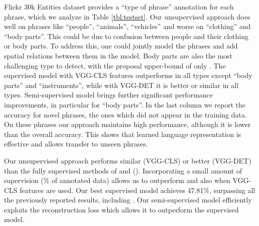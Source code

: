 Flickr 30k Entities dataset provides a ``type of phrase'' annotation for each phrase, which we analyze in Table \ref{tbl:testset}. Our unsupervised approach does well on phrases like ``people'', ``animals'', ``vehicles'' and worse on ``clothing'' and ``body parts''. This could be due to confusion between people and their clothing or body parts. To address this, one could jointly model the phrases and add spatial relations between them in the model. Body parts are also the most challenging type to detect, with the proposal upper-bound of only . The supervised model with VGG-CLS features outperforms \cite{plummer15iccv} in all  types except ``body parts'' and ``instruments'', while with VGG-DET it is better or similar in all types. Semi-supervised model brings further significant performance improvements, in particular for ``body parts''.
In the last column we report the accuracy for novel phrases, \ie the ones which did not appear in the training data. On these phrases our approach maintains high performance, although it is lower than the overall accuracy. This shows that learned language representation is effective and allows transfer to unseen phrases.

Our unsupervised approach performs similar (VGG-CLS) or better (VGG-DET) than the fully supervised methods of \cite{plummer15iccv} and \cite{hu16cvpr} (). Incorporating a small amount of supervision (\% of annotated data) allows us to outperform \cite{plummer15iccv} and \cite{hu16cvpr} also when VGG-CLS features are used. Our best supervised model achieves 47.81\%, surpassing all the previously reported results, including \cite{wang2016cvpr}. Our semi-supervised model efficiently exploits the reconstruction loss  which allows it to outperform  the supervised model.

